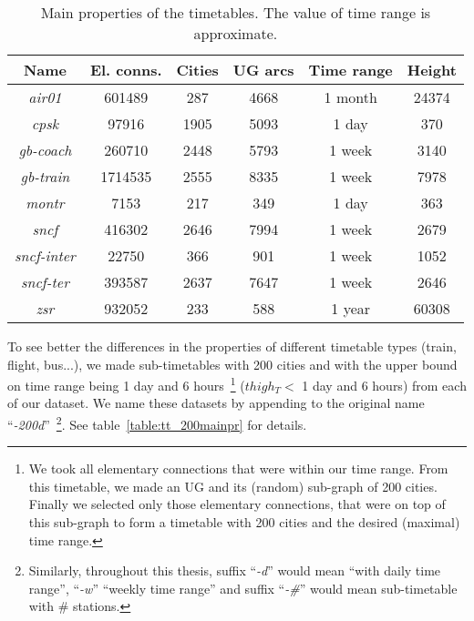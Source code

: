 	\begin{table}[h!]
		\centering
		\small
		\begin{tabular}{c|c|c|c|c|c}
			\rowcolor{tablehead}
			\textbf{Name} & \textbf{El. conns.} & \textbf{Cities} & \textbf{UG arcs} & \textbf{Time range} & \textbf{Height} \\
			\hline
			\textit{air01} & 601489 & 287 & 4668 & 1 month & 24374 \\
			\textit{cpsk} & 97916 & 1905 & 5093 & 1 day & 370 \\
			\textit{gb-coach} & 260710 & 2448 & 5793 & 1 week & 3140 \\
			\textit{gb-train} & 1714535 & 2555 & 8335 & 1 week & 7978 \\
			\textit{montr} & 7153 & 217 & 349  & 1 day & 363 \\
			\textit{sncf} & 416302 & 2646 & 7994 & 1 week & 2679 \\
			\textit{sncf-inter} & 22750 & 366 & 901 & 1 week & 1052 \\
			\textit{sncf-ter} & 393587 & 2637 & 7647 & 1 week & 2646 \\
			\textit{zsr} & 932052 & 233 & 588 & 1 year & 60308 \\
		\end{tabular}
		\caption{\label{table:tt_mainpr} Main properties of the timetables. The value of time range is approximate.}
		\normalsize
	\end{table}	
	
	\noindent To see better the differences in the properties of different timetable types (train, flight, bus...), we made sub-timetables with 200 cities and with the upper bound on time range being 1 day and 6 hours~\footnote{We took all elementary connections that were within our time range. From this timetable, we made an UG and its (random) sub-graph of 200 cities. Finally we selected only those elementary connections, that were on top of this sub-graph to form a timetable with 200 cities and the desired (maximal) time range.} ($thigh_{T} <$ 1 day and 6 hours) from each of our dataset. We name these datasets by appending to the original name ``\textit{-200d}''~\footnote{Similarly, throughout this thesis, suffix ``\textit{-d}'' would mean ``with daily time range'', ``\textit{-w}'' ``weekly time range'' and suffix ``\textit{-\#}'' would mean sub-timetable with \# stations.}. See table~\ref{table:tt_200mainpr} for details. \\
	
